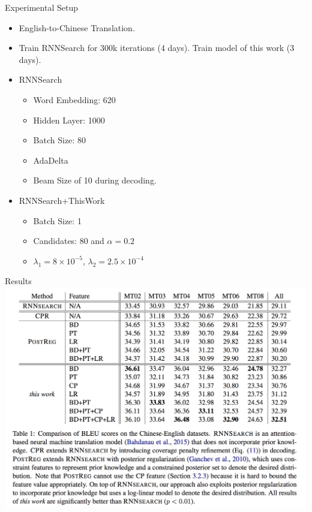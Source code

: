 \documentclass{beamer}
\begin{document}
\begin{frame}{Experimental Setup}{}
\begin{itemize}
\item English-to-Chinese Translation.
\item Train RNNSearch for 300k iterations (4 days). Train model of this work (3 days).

\item RNNSearch
\begin{itemize}
\item Word Embedding: 620
\item Hidden Layer: 1000
\item Batch Size: 80
\item AdaDelta
\item Beam Size of 10 during decoding.
\end{itemize}

\item RNNSearch+ThisWork
\begin{itemize}
\item Batch Size: 1
\item Candidates: 80 and $\alpha=0.2$
\item $\lambda_1 = 8 \times 10^{-5}$, $\lambda_2 = 2.5 \times 10^{-4}$
\end{itemize}

\end{itemize}

\end{frame}

\begin{frame}{Results}{}
\centering
\includegraphics[width=\textheight]{results}
\end{frame}
\end{document}
